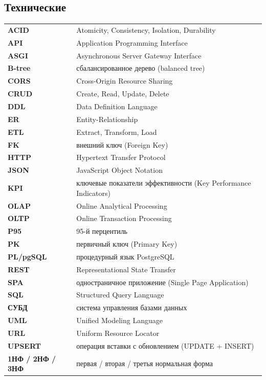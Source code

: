 \subsection*{Технические}

\noindent
\begin{tabular}{@{}>{\bfseries}p{2.6cm}Y{12.7cm}@{}}
ACID      & Atomicity, Consistency, Isolation, Durability \\
API       & Application Programming Interface \\
ASGI      & Asynchronous Server Gateway Interface \\
B-tree    & сбалансированное дерево (balanced tree) \\
CORS      & Cross-Origin Resource Sharing \\
CRUD      & Create, Read, Update, Delete \\
DDL       & Data Definition Language \\
ER        & Entity-Relationship \\
ETL       & Extract, Transform, Load \\
FK        & внешний ключ (Foreign Key) \\
HTTP      & Hypertext Transfer Protocol \\
JSON      & JavaScript Object Notation \\
KPI       & ключевые показатели эффективности (Key Performance Indicators) \\
OLAP      & Online Analytical Processing \\
OLTP      & Online Transaction Processing \\
P95       & 95-й перцентиль \\
PK        & первичный ключ (Primary Key) \\
PL/pgSQL  & процедурный язык PostgreSQL \\
REST      & Representational State Transfer \\
SPA       & одностраничное приложение (Single Page Application) \\
SQL       & Structured Query Language \\
СУБД      & система управления базами данных \\
UML       & Unified Modeling Language \\
URL       & Uniform Resource Locator \\
UPSERT    & операция вставки с обновлением (UPDATE + INSERT) \\
1НФ / 2НФ / 3НФ & первая / вторая / третья нормальная форма \\
\end{tabular}

